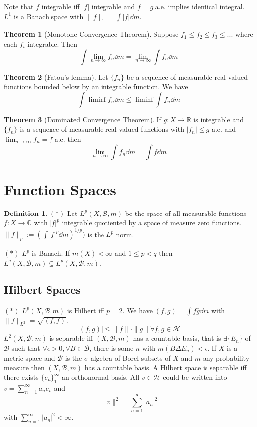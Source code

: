 \documentclass{article}
\theoremstyle{definition}
\newtheorem{thm}{Theorem}
\newtheorem{dfn}{Definition}
\newcommand{\CC}{\mathbb C}
\newcommand{\RR}{\mathbb R}
\begin{document}
Note that $f$ integrable iff $|f|$ integrable and $f = g$ a.e. implies identical integral.
$L^1$ is a Banach space with $\|f\|_1 = \int |f| \dd{m}$.

\begin{thm}[Monotone Convergence Theorem]
	Suppose $f_1 \leq f_2 \leq f_3 \leq ...$ where each $f_i$ integrable. 	
	Then 
	\[
		\int \lim_{n \to \infty} f_n \dd{m} = \lim_{n \to \infty} \int f_n \dd{m}
	\]
\end{thm}

\begin{thm}[Fatou's lemma]
	Let $\{f_n\}$ be a sequence of measurable real-valued functions bounded below by an integrable function.
	We have
	\[
		\int \liminf f_n \dd{m} \leq \liminf \int f_n \dd{m}
	\]
\end{thm}

\begin{thm}[Dominated Convergence Theorem]
	If $g: X \to \RR$ is integrable and $\{f_n\}$ is a sequence of measurable real-valued functions with $|f_n| \leq g$ a.e. and $\lim_{n \to \infty} f_n = f$ a.e. then 
	\[
		\lim_{n \to \infty} \int f_n \dd{m} = \int f \dd{m}
	\]
\end{thm}

\section{Function Spaces}

\begin{dfn}
	$(*)$
	Let $L^p(X, \mathscr{B}, m)$ be the space of all measurable functions $f: X \to \CC$ with $|f|^p$ integrable quotiented by a space of measure zero functions.
	$\|f\|_p := (\int |f|^p \dd{m})^{1/p})$ is the $L^p$ norm.
\end{dfn}

$(*)$
$L^p$ is Banach.
If $m(X) < \infty$ and $1 \leq p < q$ then $L^q(X, \mathscr{B}, m) \subseteq L^p(X, \mathscr{B}, m)$.

\subsection{Hilbert Spaces}

$(*)$
$L^p(X, \mathscr{B}, m)$ is Hilbert iff $p = 2$.
We have $(f, g) = \int f \overline{g} \dd{m}$ with $\|f\|_{L^2} = \sqrt{(f, f)}$.
\[
	|(f, g)| \leq \|f\| \cdot \|g\|  \forall f, g \in \mathscr{H}
\]
$L^2(X, \mathscr{B}, m)$ is separable iff $(X, \mathscr{B}, m)$ has a countable basis, that is $\exists \{E_n\}$ of $\mathscr{B}$ such that $\forall \epsilon > 0, \forall B \in \mathscr{B}$, there is some $n$ with $m(B \Delta E_n) < \epsilon$.
If $X$ is a metric space and $\mathscr{B}$ is the $\sigma$-algebra of Borel subsets of $X$ and $m$ any probability measure then $(X, \mathscr{B}, m)$ has a countable basis.
A Hilbert space is separable iff there exists $\{e_n\}_1^\infty$ an orthonormal basis.
All $v \in \mathscr{H}$ could be written into $v = \sum_{n = 1}^\infty a_n e_n$ and
\[
	\|v\|^2 = \sum_{n = 1}^\infty |a_n|^2
\]
with $\sum_{n = 1}^\infty |a_n|^2 < \infty$.
\end{document}

